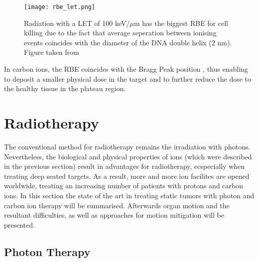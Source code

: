 \documentclass[type=dr, dr=rernat, accentcolor=tud7b,colorbacktitle, bigchapter, openright, twoside, 12pt ]{tudthesis}
\begin{document}

\begin{figure}[H]
\begin{center}
\texttt{[image: rbe\_let.png]}
\caption{Radiation with a LET of 100 keV/${\mu}$m has the biggest RBE for cell killing due to the fact that average seperation between 
ionising events coincides with the diameter of the DNA double helix (2 nm). Figure taken from \cite{Hal06}}
\label{rbe_let}
\end{center}
\end{figure}

In carbon ions, the RBE coincides with the Bragg Peak position \cite{Kra00}, thus enabling to deposit a smaller physical dose in the 
target and to further reduce the dose to the healthy tissue in the plateau region.  




\newpage


\section{Radiotherapy}

The conventional method for radiotherapy remains the irradiation with photons. Nevertheless, the biological and physical properties of ions 
(which were described in the previous section) result in advantages for radiotherapy, ecspecially when treating deep seated targets. 
As a result, more and more ion facilites are opened worldwide, treating an increasing number of patients with protons and carbon ions. 
In this section the state of the art in treating static tumors with photon and carbon ion therapy will be summarised. 
Afterwards organ motion and the resultant difficulties, as well as approaches for motion mitigation will be presented. 

\subsection{Photon Therapy}
\end{document}
